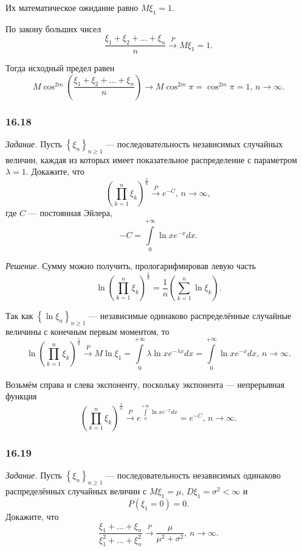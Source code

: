 \begin{enumerate}[label=\alph*)]
Их математическое ожидание равно $M \xi_1 = 1$.

По закону больших чисел
$$ \frac{ \xi_1 + \xi_2 + \dotsc + \xi_n}{n} \overset{P}{ \rightarrow } M \xi_1 = 1.$$

Тогда исходный предел равен
$$M \cos^{2m} \left( \frac{ \xi_1 + \xi_2 + \dotsc + \xi_n}{n} \right) \to M \cos^{2m} \pi =
\cos^{2m} \pi = 1, \,
n \to \infty.$$
\end{enumerate}

\subsubsection*{16.18}

\textit{Задание.}
Пусть $ \left\{ \xi_n \right\}_{n \geq 1}$ --- последовательность независимых случайных величин,
каждая из которых имеет показательное распределение с параметром $ \lambda = 1$.
Докажите, что
$$ \left( \prod \limits_{k = 1}^n \xi_k \right)^{ \frac{1}{n}} \overset{P}{ \rightarrow } e^{-C}, \,
  n \to \infty,$$
где $C$ --- постоянная Эйлера,
$$-C =
  \int \limits_0^{+ \infty } \ln x e^{-x} dx.$$

\textit{Решение.} Сумму можно получить, прологарифмировав левую часть
$$ \ln \left( \prod \limits_{k = 1}^n \xi_k \right)^{ \frac{1}{n}} =
  \frac{1}{n} \left( \sum \limits_{k = 1}^n \ln \xi_k \right).$$

Так как $ \left\{ \ln \xi_n \right\}_{n \geq 1}$ ---
независимые одинаково распределённые случайные величины с конечным первым моментом, то
$$ \ln \left( \prod \limits_{k = 1}^n \xi_k \right)^{ \frac{1}{n}} \overset{P}{ \rightarrow }
  M \ln \xi_1 =
  \int \limits_0^{+ \infty } \lambda \ln x e^{- \lambda x} dx =
  \int \limits_0^{+ \infty } \ln x e^{- x} dx, \,
  n \to \infty.$$

Возьмём справа и слева экспоненту, поскольку экспонента --- непрерывная функция
$$ \left( \prod \limits_{k = 1}^n \xi_k \right)^{ \frac{1}{n}} \overset{P}{ \rightarrow }
  e^{ \int \limits_0^{+ \infty } \ln x e^{-x} dx} =
  e^{-C}, \,
  n \to \infty.$$

\subsubsection*{16.19}

\textit{Задание.}
Пусть $ \left\{ \xi_n \right\}_{n \geq 1}$ ---
последовательность независимых одинаково распределённых случайных величин с
$M \xi_1 = \mu, \, D \xi_1 = \sigma^2 < \infty $ и
$$P \left( \xi_1 = 0 \right) =
  0.$$
Докажите, что
$$ \frac{ \xi_1 + \dotsc + \xi_n}{ \xi_1^2 + \dotsc + \xi_n^2} \overset{P}{ \rightarrow }
  \frac{ \mu }{ \mu^2 + \sigma^2}, \,
  n \to \infty.$$

